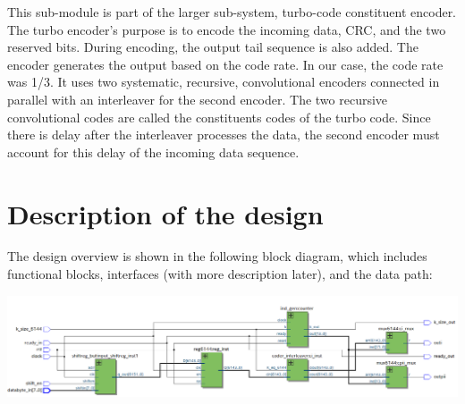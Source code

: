 \documentclass[letterpaper, 12pt]{article} %
\begin{document}
        This sub-module is part of the larger sub-system, turbo-code constituent encoder. The turbo encoder's purpose is to encode the incoming data, CRC, and the two reserved bits. During encoding, the output tail sequence is also added. The encoder generates the output based on the code rate. In our case, the code rate was 1/3. It uses two systematic, recursive, convolutional encoders connected in parallel with an interleaver for the second encoder. The two recursive convolutional codes are called the constituents codes of the turbo code. Since there is delay after the interleaver processes the data, the second encoder must account for this delay of the incoming data sequence.
\section{Description of the design}

The design overview is shown in the following block diagram, which includes functional blocks, interfaces (with more description later), and the data path:

\begin{center}
    \includegraphics[width=15cm, angle=0]{files/rtl_all}
\end{center}
\end{document}

